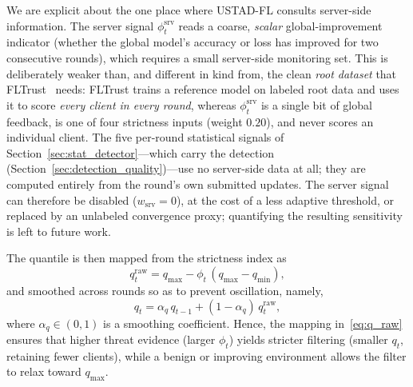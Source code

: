 \documentclass[journal]{IEEEtran}
\begin{document}
We are explicit about the one place where USTAD-FL consults server-side information. The server signal $\phi_t^{\mathrm{srv}}$ reads a coarse, \emph{scalar} global-improvement indicator (whether the global model's accuracy or loss has improved for two consecutive rounds), which requires a small server-side monitoring set. This is deliberately weaker than, and different in kind from, the clean \emph{root dataset} that FLTrust~\cite{cao2020fltrust} needs: FLTrust trains a reference model on labeled root data and uses it to score \emph{every client in every round}, whereas $\phi_t^{\mathrm{srv}}$ is a single bit of global feedback, is one of four strictness inputs (weight $0.20$), and never scores an individual client. The five per-round statistical signals of Section~\ref{sec:stat_detector}---which carry the detection (Section~\ref{sec:detection_quality})---use no server-side data at all; they are computed entirely from the round's own submitted updates. The server signal can therefore be disabled ($w_{\mathrm{srv}}=0$), at the cost of a less adaptive threshold, or replaced by an unlabeled convergence proxy; quantifying the resulting sensitivity is left to future work.

The quantile is then mapped from the strictness index as
\begin{equation}
q_t^{\mathrm{raw}} = q_{\max} - \phi_t\,(q_{\max} - q_{\min}),
\label{eq:q_raw}
\end{equation}
and smoothed across rounds so as to prevent oscillation, namely,
\begin{equation}
q_t = \alpha_q\, q_{t-1} + (1-\alpha_q)\, q_t^{\mathrm{raw}},
\label{eq:q_smooth}
\end{equation}
where $\alpha_q \in (0,1)$ is a smoothing coefficient. Hence, the mapping in~\eqref{eq:q_raw} ensures that higher threat evidence (larger $\phi_t$) yields stricter filtering (smaller $q_t$, retaining fewer clients), while a benign or improving environment allows the filter to relax toward $q_{\max}$.
\end{document}
